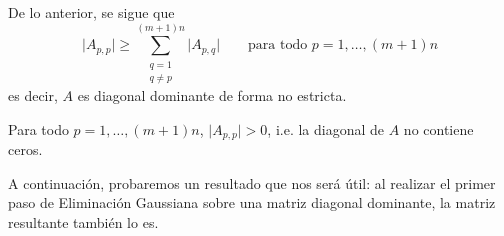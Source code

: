       De lo anterior, se sigue que
        \[ \vert A_{p,p} \vert \geq \sum_{\substack{q=1 \\ q \neq p}}^{(m+1)n} \vert A_{p,q} \vert \qquad \text{para todo $p = 1, \dots, (m+1)n$} \]
      es decir, $A$ es diagonal dominante de forma no estricta.

      \begin{obs}
        \label{obs:Diagonal de A sin ceros}
        Para todo $p = 1, \dots, (m+1)n$, $\vert A_{p,p} \vert > 0$, i.e. la diagonal de $A$ no contiene ceros.
      \end{obs}

      A continuación, probaremos un resultado que nos será útil: al realizar el primer paso de Eliminación Gaussiana sobre una matriz diagonal dominante, la matriz resultante también lo es.

